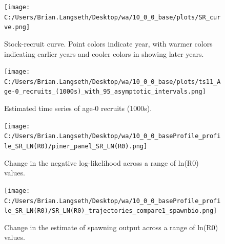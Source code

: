 \documentclass[11pt,
  english,
  letterpaper,
]{article}
\begin{document}
\begin{figure}
\centering
\texttt{[image: C:/Users/Brian.Langseth/Desktop/wa/10\_0\_0\_base/plots/SR\_curve.png]}
\caption{Stock-recruit curve. Point colors indicate year, with warmer colors indicating earlier years and cooler colors in showing later years.\label{fig:bh-curve}}
\end{figure}

\tagmcend\tagstructend


\begin{figure}
\centering
\texttt{[image: C:/Users/Brian.Langseth/Desktop/wa/10\_0\_0\_base/plots/ts11\_Age-0\_recruits\_(1000s)\_with\_95\_asymptotic\_intervals.png]}
\caption{Estimated time series of age-0 recruits (1000s).\label{fig:recruits}}
\end{figure}

\tagmcend\tagstructend


\begin{figure}
\centering
\texttt{[image: C:/Users/Brian.Langseth/Desktop/wa/10\_0\_0\_baseProfile\_profile\_SR\_LN(R0)/piner\_panel\_SR\_LN(R0).png]}
\caption{Change in the negative log-likelihood across a range of ln(R0) values.\label{fig:r0-profile}}
\end{figure}

\tagmcend\tagstructend


\begin{figure}
\centering
\texttt{[image: C:/Users/Brian.Langseth/Desktop/wa/10\_0\_0\_baseProfile\_profile\_SR\_LN(R0)/SR\_LN(R0)\_trajectories\_compare1\_spawnbio.png]}
\caption{Change in the estimate of spawning output across a range of ln(R0) values.\label{fig:r0-ssb}}
\end{figure}

\tagmcend\tagstructend
\end{document}
